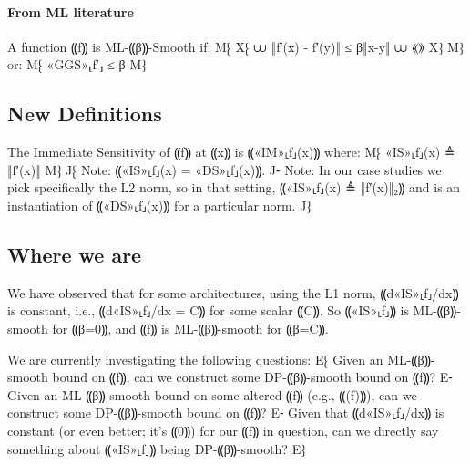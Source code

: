 \documentclass{article}
\begin{document}
\paragraph{From ML literature}

\begin{definition}[ML-⸨β⸩-Smoothness]
  A function ⸨f⸩ is ML-⸨β⸩-Smooth if:
  M⁅ X⁅ ⩊ ‖f′(x) - f′(y)‖ ≤ β‖x-y‖ 
        ⩊ ⟪\citep[§ 3]{convex-optimization-ml-slides}⟫
     X⁆
  M⁆
  or:
  M⁅ «GGS»⸤f′⸥ ≤ β M⁆
\end{definition}

\subsection{New Definitions}

\begin{definition}
  The Immediate Sensitivity of ⸨f⸩ at ⸨x⸩ is ⸨«IM»⸤f⸥(x)⸩ where:
  M⁅ «IS»⸤f⸥(x) ≜ ‖f′(x)‖ M⁆
  J⁅ Note: ⸨«IS»⸤f⸥(x) = «DS»⸤f⸥(x)⸩.
  J⁃ Note: In our case studies we pick specifically the L2 norm, so in that
     setting, ⸨«IS»⸤f⸥(x) ≜ ‖f′(x)‖₂⸩ and is an instantiation of ⸨«DS»⸤f⸥(x)⸩
     for a particular norm.
  J⁆
\end{definition}

\subsection{Where we are}

We have observed that for some architectures, using the L1 norm, ⸨d«IS»⸤f⸥/dx⸩
is constant, i.e.,  ⸨d«IS»⸤f⸥/dx = C⸩ for some scalar ⸨C⸩. So ⸨«IS»⸤f⸥⸩ is
ML-⸨β⸩-smooth for ⸨β=0⸩, and ⸨f⸩ is ML-⸨β⸩-smooth for ⸨β=C⸩.

We are currently investigating the following questions:
E⁅ Given an ML-⸨β⸩-smooth bound on ⸨f⸩, can we construct some DP-⸨β⸩-smooth bound
   on ⸨f⸩?
E⁃ Given an ML-⸨β⸩-smooth bound on some altered ⸨f⸩ (e.g., ⸨\ln(f)⸩), can we
   construct some DP-⸨β⸩-smooth bound on ⸨f⸩?
E⁃ Given that ⸨d«IS»⸤f⸥/dx⸩ is constant (or even better; it's ⸨0⸩) for our ⸨f⸩
   in question, can we directly say something about ⸨«IS»⸤f⸥⸩ being DP-⸨β⸩-smooth?
E⁆



\end{document}
